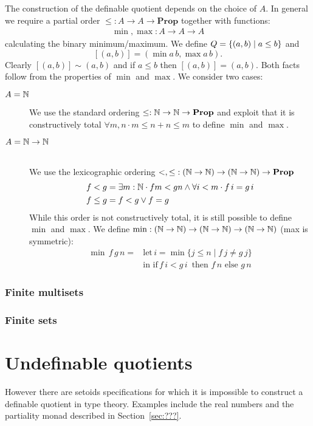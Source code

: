 \documentclass{llncs}
\newcommand{\prop}{\mathbf{Prop}}
\begin{document}
The construction of the definable quotient depends on the choice of $A$. In general we
require a partial order $\leq : A \to A \to \prop$ together with functions:
\begin{align*}
\min, \max : A \to A \to A
\end{align*}
calculating the binary minimum/maximum. We define $Q = \left\{(a , b) \mid  a \leq b\right\}$ and 
\[ [(a,b)] = (\min a\, b, \max a \,b).\]
Clearly $[(a,b)] \sim (a,b)$ and if $a\leq b$ then $[(a,b)]=(a,b)$. Both facts follow from
 the properties of $\min$ and $\max$. We consider two cases:
\begin{description}
\item[$A = \nat$] \hfill 

We use the standard ordering $\leq : \nat \to \nat \to \prop$ and exploit
that it is constructively total $\forall m ,n\cdot m \leq n + n \leq m$ to define $\min$ and 
$\max$.  
\item[$A=\nat\to\nat$] \hfill\\
We use the lexicographic ordering ${<},{\leq}:(\nat \to \nat) \to (\nat\to\nat)\to\prop$
\begin{align*}
f < g & = \exists m:\nat \cdot f m < g n \wedge \forall i<m\cdot f\,i = g \,i\\
f \leq g &= f < g \vee f=g
\end{align*}
While this order is not constructively total, it is still possible to define $\min$ and $\max$. 
We define $\min : (\mathbb {N} \to \mathbb {N}) \to (\mathbb {N}\to\mathbb {N}) \to (\mathbb {N} \to \mathbb {N})$ (max is symmetric):
\begin{align*}
 \min\,f\,g\,n = &\text{let}\,i = \min \{ j \leq n \mid f\,j \not= g\,j \}\\ 
                 &\text{in }\text{if}\, f\,i< g\,i\,\text{ then } f\,n \text{ else } g\,n   
\end{align*} 
\end{description}


\subsubsection*{Finite multisets}

\subsubsection*{Finite sets}


\section{Undefinable quotients}
However there are setoids specifications for which it is impossible to construct a definable quotient in type theory. Examples include the real numbers and the partiality monad described in Section~\ref{sec:???}.
\end{document}
